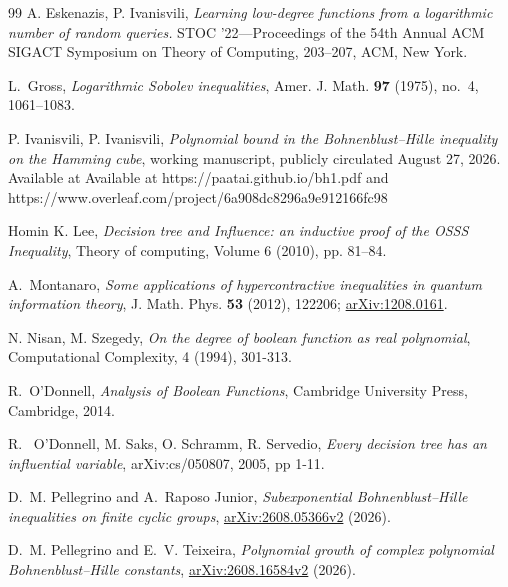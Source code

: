 \documentclass[11pt]{article}
\theoremstyle{definition}
\theoremstyle{remark}
\begin{document}
\begin{thebibliography}{99}
A. Eskenazis, P. Ivanisvili, 
\emph{Learning low-degree functions from a logarithmic number of random queries.}
 STOC '22—Proceedings of the 54th Annual ACM SIGACT Symposium on Theory of Computing, 203--207, ACM, New York.
 
 

L.~Gross,
\emph{Logarithmic Sobolev inequalities},
Amer. J. Math. \textbf{97} (1975), no.~4, 1061--1083.

 P. Ivanisvili,
 P. Ivanisvili,
 \emph{Polynomial bound in the Bohnenblust–Hille inequality on the Hamming cube}, 
 working manuscript, publicly circulated August 27, 2026. 
 Available at Available at https://paatai.github.io/bh1.pdf and
 https://www.overleaf.com/project/6a908dc8296a9e912166fc98

Homin K. Lee,
\emph{Decision tree and Influence: an inductive proof of the OSSS Inequality},
Theory of computing, Volume 6 (2010), pp. 81--84.

A.~Montanaro,
\emph{Some applications of hypercontractive inequalities in quantum
information theory},
J. Math. Phys. \textbf{53} (2012), 122206;
\href{https://arxiv.org/abs/1208.0161}{arXiv:1208.0161}.


N. Nisan, M. Szegedy,
\emph{On the degree of boolean function as real polynomial},
Computational Complexity, 4 (1994), 301-313.

R.~O'Donnell,
\emph{Analysis of Boolean Functions},
Cambridge University Press, Cambridge, 2014.

R. ~O'Donnell, M. Saks, O. Schramm, R. Servedio,
\emph{Every decision tree has an influential variable},
arXiv:cs/050807, 2005, pp 1-11.

D.~M. Pellegrino and A.~Raposo Junior,
\emph{Subexponential Bohnenblust--Hille inequalities on finite cyclic groups},
\href{https://arxiv.org/abs/2608.05366}{arXiv:2608.05366v2} (2026).

D.~M. Pellegrino and E.~V. Teixeira,
\emph{Polynomial growth of complex polynomial Bohnenblust--Hille constants},
\href{https://arxiv.org/abs/2608.16584}{arXiv:2608.16584v2} (2026).


\end{thebibliography}
\end{document}
